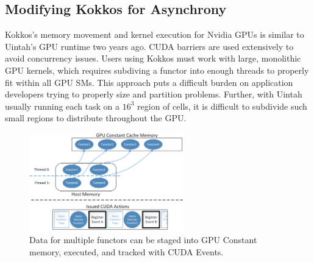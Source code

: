 \documentclass[12pt]{article}
\begin{document}



\subsection{Modifying Kokkos for Asynchrony}
\label{ch:kokkos_modifications}
Kokkos's memory movement and kernel execution for Nvidia GPUs is similar to Uintah's GPU runtime two years ago.  CUDA barriers are used extensively to avoid concurrency issues.  Users using Kokkos must work with large, monolithic GPU kernels, which requires subdiving a functor into enough threads to properly fit within all GPU SMs.  This approach puts a difficult burden on application developers trying to properly size and partition problems.  Further, with Uintah usually running each task on a $16^3$ region of cells, it is difficult to subdivide such small regions to distribute throughout the GPU.  

\begin{figure}
	\centering
	\includegraphics[width=0.60\textwidth]{figures/Kokkos_constant_cache_new.png}
	\caption{Data for multiple functors can be staged into GPU Constant memory, executed, and tracked with CUDA Events.   }
	\label{fig:kokkos-constant-cache-new}
\end{figure}
\end{document}
